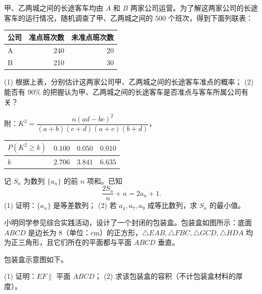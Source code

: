 \begin{question}
甲、乙两城之间的长途客车均由 $A$ 和 $B$ 两家公司运营。为了解这两家公司的长途客车的运行情况，随机调查了甲、乙两城之间的 500 个班次，得到下面列联表：

\begin{center}
\begin{tabular}{lrr}
\toprule
公司 & 准点班次数 & 未准点班次数 \\
\midrule
A & 240 & 20 \\
B & 210 & 30 \\
\bottomrule
\end{tabular}
\end{center}

(1) 根据上表，分别估计这两家公司甲、乙两城之间的长途客车准点的概率；  
(2) 能否有 $90\%$ 的把握认为甲、乙两城之间的长途客车是否准点与客车所属公司有关？

附：$K^2=\dfrac{n(ad-bc)^2}{(a+b)(c+d)(a+c)(b+d)}$，

\begin{center}
\begin{tabular}{lrrr}
\toprule
$P(K^2\geq k)$ & $0.100$ & $0.050$ & $0.010$ \\
\midrule
$k$ & $2.706$ & $3.841$ & $6.635$ \\
\bottomrule
\end{tabular}
\end{center}

\end{question}
\begin{question}
记 $S_n$ 为数列 $\{a_n\}$ 的前 $n$ 项和。已知
\nopagebreak[4]
\[\frac{2S_n}{n}+n=2a_n+1.\]
(1) 证明：$\{a_n\}$ 是等差数列；  
(2) 若 $a_4,a_7,a_9$ 成等比数列，求 $S_n$ 的最小值。

\Needspace{0.4\textheight}
\end{question}
\begin{question}
小明同学参见综合实践活动，设计了一个封闭的包装盒。包装盒如图所示：底面 $ABCD$ 是边长为 $8$（单位：cm）的正方形，$\triangle EAB,\triangle FBC,\triangle GCD,\triangle HDA$ 均为正三角形，且它们所在的平面都与平面 $ABCD$ 垂直。

包装盒示意图如下。
\nopagebreak[4]
\begin{center}\end{center}
\nopagebreak[4]
(1) 证明：$EF\parallel$ 平面 $ABCD$；  
(2) 求该包装盒的容积（不计包装盒材料的厚度）。

\end{question}
